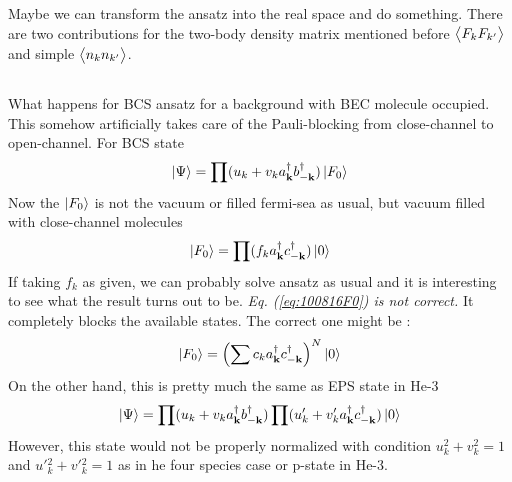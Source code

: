 Maybe we can transform the ansatz into the real space and do something.  There are two contributions for the two-body density matrix mentioned before $\bigl<{F_{k}F_{k'}}\bigr>$ and simple $\bigl<{n_{k}n_{k'}}\bigr>$.  


\subsection{}
What happens for BCS ansatz for a background with BEC molecule occupied.  This somehow artificially takes care of the Pauli-blocking from close-channel to open-channel. For BCS state
\begin{equation}
\left|\Psi\right>=\prod(u_{k}+v_{k}a^{\dagger}_{\mathbf{k}}b^{\dagger}_{-\mathbf{k}})\left|F_{0}\right>
\end{equation}
Now the $\left|F_{0}\right>$ is not the vacuum or filled fermi-sea as usual, but vacuum filled with close-channel molecules
\begin{equation}\label{eq:100816F0}
\left|F_{0}\right>=\prod(f_{k}a^{\dagger}_{\mathbf{k}}c^{\dagger}_{-\mathbf{k}})\left|0\right>
\end{equation}
If taking $f_{k}$ as given, we can probably solve ansatz as usual and it is interesting to see what the result turns out to be.  
\emph{Eq. (\ref{eq:100816F0}) is not correct. } It  completely blocks the available states.  The correct one might be :
\begin{equation}
\left|F_{0}\right>=\left(\sum{c_{k}a^{\ensuremath{\dagger}}_{\ensuremath{\mathbf{k}}}c^{\ensuremath{\dagger}}_{-\ensuremath{\mathbf{k}}}}\right)^{N}\left|0\right>	
\end{equation}
On the other hand, this is pretty much the same as EPS state in He-3
\begin{equation}
\left|\Psi\right>=\prod(u_{k}+v_{k}a^{\dagger}_{\mathbf{k}}b^{\dagger}_{-\mathbf{k}})\prod(u'_{k}+v'_{k}a^{\dagger}_{\mathbf{k}}c^{\dagger}_{-\mathbf{k}})\left|0\right>
\end{equation}
However, this state would  not be properly normalized with condition $u_{k}^{2}+v_{k}^{2}=1$ and $u' {}_{k}^{2}+v' {}_{k}^{2}=1$ as in he four species case or p-state in He-3.   